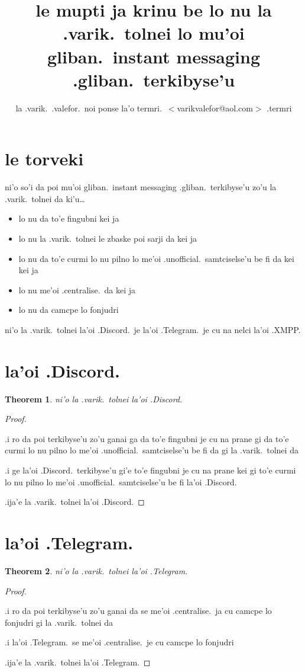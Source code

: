 \documentclass{article}
\title{le mupti ja krinu be lo nu la .varik.\ tolnei lo mu'oi gliban.\ instant messaging .gliban.\ terkibyse'u}
\author{la .varik.\ .valefor.\ noi ponse la'o termri.\ $<$varikvalefor@aol.com$>$ .termri}
\newtheorem{thm}{Theorem}
\begin{document}
\maketitle

\section{le torveki}
ni'o so'i da poi mu'oi gliban.\ instant messaging .gliban.\ terkibyse'u zo'u la .varik.\ tolnei da ki'u\ldots
\begin{itemize}
	\item lo nu da to'e fingubni kei ja
	\item lo nu la .varik.\ tolnei le zbaske poi sarji da kei ja
	\item lo nu da to'e curmi lo nu pilno lo me'oi .unofficial.\ samtciselse'u be fi da kei kei ja
	\item lo nu me'oi .centralise.\ da kei ja
	\item lo nu da camcpe lo fonjudri
\end{itemize}

ni'o la .varik.\ tolnei la'oi .Discord.\ je la'oi .Telegram.\ je cu na nelci la'oi .XMPP.
\section{la'oi .Discord.}
\begin{thm}
	ni'o la .varik.\ tolnei la'oi .Discord.
\end{thm}
\begin{proof}
	${}$

	.i ro da poi terkibyse'u zo'u ganai ga da to'e fingubni je cu na prane gi da to'e curmi lo nu pilno lo me'oi .unofficial.\ samtciselse'u be fi da gi la .varik.\ tolnei da

	.i ge la'oi .Discord.\ terkibyse'u gi'e to'e fingubni je cu na prane kei gi to'e curmi lo nu pilno lo me'oi .unofficial.\ samtciselse'u be fi la'oi .Discord.

	.ija'e la .varik.\ tolnei la'oi .Discord.
\end{proof}

\section{la'oi .Telegram.}
\begin{thm}
	ni'o la .varik.\ tolnei la'oi .Telegram.
\end{thm}
\begin{proof}
	${}$

	.i ro da poi terkibyse'u zo'u ganai da se me'oi .centralise.\ ja cu camcpe lo fonjudri gi la .varik.\ tolnei da

	.i la'oi .Telegram.\ se me'oi .centralise.\ je cu camcpe lo fonjudri

	.ija'e la .varik.\ tolnei la'oi .Telegram.
\end{proof}
\end{document}

